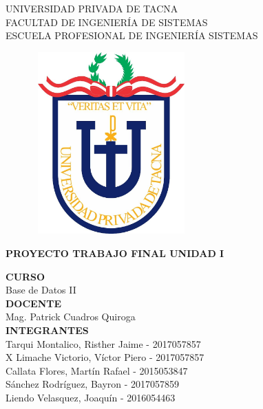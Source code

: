 \documentclass[12pt,a4paper,oneside]{book}
\begin{document}
	
	\thispagestyle{empty} 
	
	\begin{center} 
		\LARGE{UNIVERSIDAD PRIVADA DE TACNA} \\[0.5cm] 
		\Large{FACULTAD DE INGENIERÍA DE SISTEMAS}\\[0.5cm] 
		\large{ ESCUELA PROFESIONAL DE INGENIERÍA SISTEMAS} 
	\end{center}
	
	\begin{figure}[htb]
		\centering \includegraphics[width=6cm, height=7cm]{img/uptlogo.jpg}
	\end{figure}
	
	\begin{center} 
			\LARGE{\bf PROYECTO TRABAJO FINAL \newline UNIDAD I }\\ \vspace{.25cm}
		
	\end{center}

	\begin{center} 
		
		\textbf {CURSO}\\ 
		\large Base de Datos II \\
		
		\textbf {DOCENTE}\\
		\large Mag. Patrick Cuadros Quiroga\\
	
		\textbf {INTEGRANTES}\\
		\large Tarqui Montalico, Risther Jaime - 2017057857 \\ X
		\large Limache Victorio, V\'ictor Piero - 2017057857 \\
		\large Callata Flores, Mart\'in Rafael - 2015053847 \\
		\large S\'anchez Rodr\'iguez, Bayron - 2017057859 \\
		\large Liendo Velasquez, Joaqu\'in - 2016054463 \\
		
		
	\end{center}
\end{document}
